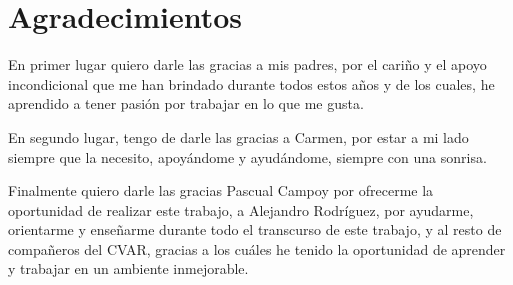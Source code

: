 \chapter*{Agradecimientos}

En primer lugar quiero darle las gracias a mis padres, por el cariño y el apoyo incondicional que me han brindado durante todos estos años y de los cuales, he aprendido a tener pasión por trabajar en lo que me gusta.

En segundo lugar, tengo de darle las gracias a Carmen, por estar a mi lado siempre que la necesito, apoyándome y ayudándome, siempre con una sonrisa.

Finalmente quiero darle las gracias Pascual Campoy por ofrecerme la oportunidad de realizar este trabajo, a Alejandro Rodríguez, por ayudarme, orientarme y enseñarme durante todo el transcurso de este trabajo, y al resto de compañeros del CVAR, gracias a los cuáles he tenido la oportunidad de aprender y trabajar en un ambiente inmejorable.